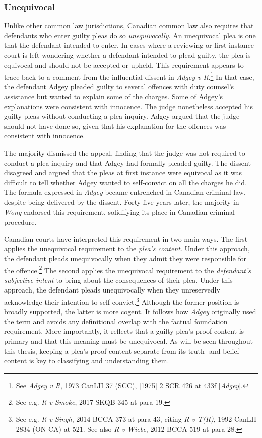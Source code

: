 \subsubsection{Unequivocal}

Unlike other common law jurisdictions, Canadian common law also requires that defendants who enter guilty pleas do so \textit{unequivocally}. An unequivocal plea is one that the defendant intended to enter. In cases where a reviewing or first-instance court is left wondering whether a defendant intended to plead guilty, the plea is equivocal and should not be accepted or upheld. This requirement appears to trace back to a comment from the influential dissent in \textit{Adgey v R}.\footnote{See \textit{Adgey v R},  1973 CanLII 37 (SCC), [1975] 2 SCR 426 at 433f [\textit{Adgey}].} In that case, the defendant Adgey pleaded guilty to several offences with duty counsel's assistance but wanted to explain some of the charges. Some of Adgey's explanations were consistent with innocence. The judge nonetheless accepted his guilty pleas without conducting a plea inquiry. Adgey argued that the judge should not have done so, given that his explanation for the offences was consistent with innocence. 

The majority dismissed the appeal, finding that the judge was not required to conduct a plea inquiry and that Adgey had formally pleaded guilty. The dissent disagreed and argued that the pleas at first instance were equivocal as it was difficult to tell whether Adgey wanted to self-convict on all the charges he did. The formula expressed in \textit{Adgey} became entrenched in Canadian criminal law, despite being delivered by the dissent. Forty-five years later, the majority in \textit{Wong} endorsed this requirement, solidifying its place in Canadian criminal procedure.

Canadian courts have interpreted this requirement in two main ways. The first applies the unequivocal requirement to the \textit{plea's content}. Under this approach, the defendant pleads unequivocally when they admit they were responsible for the offence.\footnote{See e.g. \textit{R v Smoke}, 2017 SKQB 345 at para 19.} The second applies the unequivocal requirement to the \textit{defendant's subjective intent} to bring about the consequences of their plea. Under this approach, the defendant pleads unequivocally when they unreservedly acknowledge their intention to self-convict.\footnote{See e.g. \textit{R v Singh}, 2014 BCCA 373 at para 43, citing \textit{R v T(R)}, 1992 CanLII 2834 (ON CA) at 521. See also \textit{R v Wiebe}, 2012 BCCA 519 at para 28.} Although the former position is broadly supported, the latter is more cogent. It follows how \textit{Adgey} originally used the term and avoids any definitional overlap with the factual foundation requirement. More importantly, it reflects that a guilty plea's proof-content is primary and that this meaning must be unequivocal. As will be seen throughout this thesis, keeping a plea's proof-content separate from its truth- and belief-content is key to classifying and understanding them.
